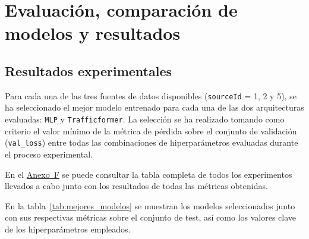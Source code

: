 \section{Evaluación, comparación de modelos y resultados}
\label{sec:evaluacion}

%
%

\subsection{Resultados experimentales}
\label{sec:resultados_exp}

Para cada una de las tres fuentes de datos disponibles (\texttt{sourceId} = 1, 2 y 5), se ha seleccionado el mejor modelo entrenado para cada una de las dos arquitecturas evaluadas: \texttt{MLP} y \texttt{Trafficformer}. La selección se ha realizado tomando como criterio el valor mínimo de la métrica de pérdida sobre el conjunto de validación (\texttt{val\_loss}) entre todas las combinaciones de hiperparámetros evaluadas durante el proceso experimental.

En el \hyperref[anexo:resultados_exp]{Anexo~F} se puede consultar la tabla completa de todos los experimentos llevados a cabo junto con los resultados de todas las métricas obtenidas.

En la tabla~\ref{tab:mejores_modelos} se muestran los modelos seleccionados junto con sus respectivas métricas sobre el conjunto de test, así como los valores clave de los hiperparámetros empleados.

